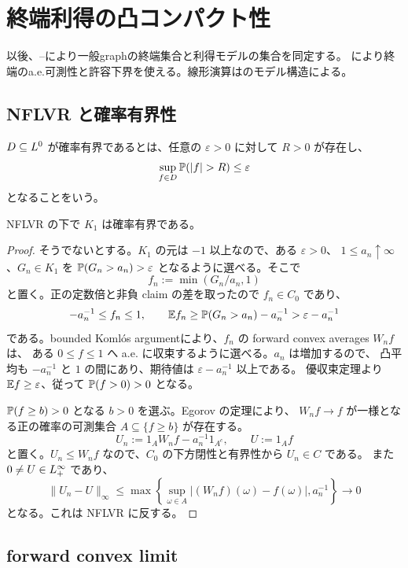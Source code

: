 \section{終端利得の凸コンパクト性}
以後、--により一般graphの終端集合と利得モデルの集合を同定する。
により終端のa.e.可測性と許容下界を使える。線形演算はのモデル構造による。


\subsection{NFLVR と確率有界性}

$D\subseteq L^0$ が確率有界であるとは、任意の $\varepsilon>0$ に対して $R>0$ が存在し、
\[
 \sup_{f\in D}\Pp(|f|>R)\leq\varepsilon
\]
となることをいう。

\begin{proposition}
\label{prop:k1-bip}
NFLVR の下で $K_1$ は確率有界である。
\end{proposition}

\begin{proof}
そうでないとする。$K_1$ の元は $-1$ 以上なので、ある $\varepsilon>0$、
$1\leq a_n\uparrow\infty$、$G_n\in K_1$ を
$\mathbb P(G_n>a_n)>\varepsilon$ となるように選べる。そこで
\[
 f_n:=\min(G_n/a_n,1)
\]
と置く。正の定数倍と非負 claim の差を取ったので $f_n\in C_0$ であり、
\[
 -a_n^{-1}\leq f_n\leq1,\qquad
 \mathbb E f_n\geq\mathbb P(G_n>a_n)-a_n^{-1}>\varepsilon-a_n^{-1}
\]
である。bounded Komlós argumentにより、$f_n$ の forward convex averages $W_nf$ は、
ある $0\leq f\leq1$ へ a.e. に収束するように選べる。$a_n$ は増加するので、
凸平均も $-a_n^{-1}$ と $1$ の間にあり、期待値は $\varepsilon-a_n^{-1}$ 以上である。
優収束定理より $\mathbb E f\geq\varepsilon$、従って $\mathbb P(f>0)>0$ となる。

$\mathbb P(f\geq b)>0$ となる $b>0$ を選ぶ。Egorov の定理により、
$W_nf\to f$ が一様となる正の確率の可測集合 $A\subseteq\{f\geq b\}$ が存在する。
\[
 U_n:=1_AW_nf-a_n^{-1}1_{A^c},\qquad U:=1_Af
\]
と置く。$U_n\leq W_nf$ なので、$C_0$ の下方閉性と有界性から $U_n\in C$ である。
また $0\ne U\in L^\infty_+$ であり、
\[
 \|U_n-U\|_\infty
 \leq\max\left\{\sup_{\omega\in A}|(W_nf)(\omega)-f(\omega)|,a_n^{-1}\right\}
 \longrightarrow0
\]
となる。これは NFLVR に反する。
\end{proof}

\subsection{forward convex limit}

